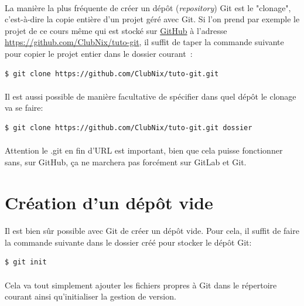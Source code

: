 \documentclass[french, a4paper, 12pt, titlepage]{article}
\begin{document}
\paragraph{} La manière la plus fréquente de créer un dépôt
(\emph{repository}) Git est le "clonage", c'est-à-dire la copie entière d'un projet géré avec Git. Si l'on prend par exemple le projet de ce cours même qui est stocké sur \href{https://github.com}{GitHub} à l'adresse
\url{https://github.com/ClubNix/tuto-git}, il suffit de taper la commande suivante pour copier le projet entier dans le dossier courant~:

\begin{lstlisting}
$ git clone https://github.com/ClubNix/tuto-git.git
\end{lstlisting}
\paragraph{}Il est aussi possible de manière facultative de spécifier dans quel dépôt le clonage va se faire:
\begin{lstlisting}
$ git clone https://github.com/ClubNix/tuto-git.git dossier
\end{lstlisting}
\paragraph{}Attention le .git en fin d'URL est important, bien que cela puisse fonctionner sans, sur GitHub, ça ne marchera pas forcément sur GitLab et Git.

\section{Création d'un dépôt vide}

\paragraph{} Il est bien sûr possible avec Git de créer un dépôt vide. Pour cela, il suffit de faire la commande suivante dans le dossier créé pour stocker le dépôt Git:

\begin{lstlisting}
$ git init
\end{lstlisting}

\paragraph{} Cela va tout simplement ajouter les fichiers propres à Git dans le répertoire courant ainsi qu'initialiser la gestion de version.
\end{document}
